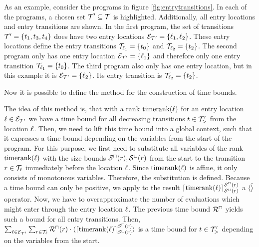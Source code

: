 As an example, consider the programs in figure \ref{fig:entrytransitions}.
In each of the programs, a chosen set $\mathcal{T}' \subseteq \mathcal{T}$ is highlighted.
Additionally, all entry locations and entry transitions are shown.
In the first program, the set of transitions $\mathcal{T}' = \lbrace t_1, t_3, t_4 \rbrace$ does have two entry locations $\mathcal{E}_{\mathcal{T}'} = \lbrace \ell_1, \ell_2 \rbrace$.
These entry locations define the entry transitions $\mathcal{T}_{\ell_1} = \lbrace t_0 \rbrace$ and $\mathcal{T}_{\ell_2} = \lbrace t_2 \rbrace$.
The second program only has one entry location $\mathcal{E}_{\mathcal{T}'} = \lbrace \ell_1 \rbrace$ and therefore only one entry transition $\mathcal{T}_{\ell_1} = \lbrace t_0 \rbrace$.
The third program also only has one entry location, but in this example it is $\mathcal{E}_{\mathcal{T}'} = \lbrace \ell_2 \rbrace$.
Its entry transition is $\mathcal{T}_{\ell_2} = \lbrace t_2 \rbrace$.

Now it is possible to define the method for the construction of time bounds.



The idea of this method is, that with a rank $\text{timerank}(\ell)$ for an entry location $\ell \in \mathcal{E}_{\mathcal{T}'}$ we have a time bound for all decreasing transitions $t \in \mathcal{T}'_>$ from the location $\ell$.
Then, we need to lift this time bound into a global context, such that it expresses a time bound depending on the variables from the start of the program.
For this purpose, we first need to substitute all variables of the rank $\text{timerank}(\ell)$ with the size bounds ${\mathcal{S}^\sqcap}(r), {\mathcal{S}^\sqcup}(r)$ from the start to the transition $r \in \mathcal{T}_{\ell}$ immediately before the location $\ell$.
Since $\text{timerank}(\ell)$ is affine, it only consists of monotonous variables.
Therefore, the substitution is defined.
Because a time bound can only be positive, we apply to the result $\lceil \text{timerank}(\ell) \rceil^{{\mathcal{S}^\sqcap}(r)}_{{\mathcal{S}^\sqcup}(r)}$ a $\langle\dot\rangle$ operator.
Now, we have to overapproximate the number of evaluations which might enter through the entry location $\ell$.
The previous time bound ${\mathcal{R}^\sqcap}$ yields such a bound for all entry transitions.
Then, $\sum_{\ell \in \mathcal{E}_{\mathcal{T}'}} \sum_{r \in \mathcal{T}_\ell} {\mathcal{R}^\sqcap}(r) \cdot \langle\lceil \text{timerank}(\ell) \rceil^{{\mathcal{S}^\sqcap}(r)}_{{\mathcal{S}^\sqcup}(r)}\rangle$ is a time bound for $t \in \mathcal{T}'_>$ depending on the variables from the start.



